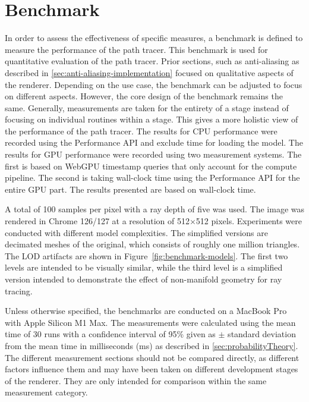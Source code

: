 \section{Benchmark}
\label{sec:benchmark}

In order to assess the effectiveness of specific measures, a benchmark is defined to measure the performance of the path tracer. This benchmark is used for quantitative evaluation of the path tracer. Prior sections, such as anti-aliasing as described in \autoref{sec:anti-aliasing-implementation} focused on qualitative aspects of the renderer. Depending on the use case, the benchmark can be adjusted to focus on different aspects. However, the core design of the benchmark remains the same. Generally, measurements are taken for the entirety of a stage instead of focusing on individual routines within a stage. This gives a more holistic view of the performance of the path tracer. The results for \gls{CPU} performance were recorded using the Performance \gls{API} and exclude time for loading the model. The results for \gls{GPU} performance were recorded using two measurement systems. The first is based on \gls{WebGPU} timestamp queries that only account for the compute pipeline. The second is taking wall-clock time using the Performance \gls{API} for the entire \gls{GPU} part. The results presented are based on wall-clock time.

A total of 100 samples per pixel with a ray depth of five was used. The image was rendered in Chrome 126/127 at a resolution of 512$\times$512 pixels. Experiments were conducted with different model complexities. The simplified versions are decimated meshes of the original, which consists of roughly one million triangles. The \gls{LOD} artifacts are shown in Figure~\ref{fig:benchmark-models}. The first two levels are intended to be visually similar, while the third level is a simplified version intended to demonstrate the effect of non-manifold geometry for ray tracing.

Unless otherwise specified, the benchmarks are conducted on a MacBook Pro with Apple Silicon M1 Max. The measurements were calculated using the mean time of 30 runs with a confidence interval of 95\% given as $\pm$ standard deviation from the mean time in milliseconds (ms) as described in \autoref{sec:probabilityTheory}. The different measurement sections should not be compared directly, as different factors influence them and may have been taken on different development stages of the renderer. They are only intended for comparison within the same measurement category.

